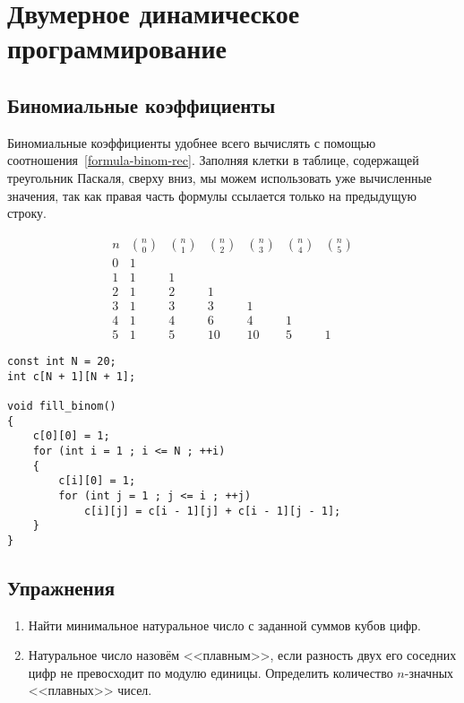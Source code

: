 \documentclass[14pt,openany]{book}
\begin{document}
\chapter{Двумерное динамическое программирование}

\section{Биномиальные коэффициенты}

Биномиальные коэффициенты удобнее всего вычислять с помощью соотношения~\ref{formula-binom-rec}.
Заполняя клетки в таблице, содержащей треугольник Паскаля, сверху вниз, мы можем
использовать уже вычисленные значения, так как правая часть формулы ссылается только на
предыдущую строку.

$$
 \begin{array}{ccccccc}
 n & \binom{n}{0} & \binom{n}{1} & \binom{n}{2} & \binom{n}{3} & \binom{n}{4} & \binom{n}{5} \\
 0 & 1 \\
 1 & 1 & 1 \\
 2 &  1 & 2 & 1 \\
 3 & 1 & 3 & 3 & 1 \\
 4 & 1 & 4 & 6 & 4 & 1 \\
 5 & 1 & 5 & 10 & 10 & 5 & 1
 \end{array}
$$

\begin{lstlisting}
const int N = 20;
int c[N + 1][N + 1];

void fill_binom()
{
    c[0][0] = 1;
    for (int i = 1 ; i <= N ; ++i)
    {
        c[i][0] = 1;
        for (int j = 1 ; j <= i ; ++j)
            c[i][j] = c[i - 1][j] + c[i - 1][j - 1];
    }
}
\end{lstlisting}

\section{Упражнения}

\begin{enumerate}

\item Найти минимальное натуральное число с заданной суммов кубов цифр.

\item Натуральное число назовём <<плавным>>, если разность двух его соседних цифр не превосходит
      по модулю единицы. Определить количество $n$-значных <<плавных>> чисел.

\end{enumerate}
\end{document}
